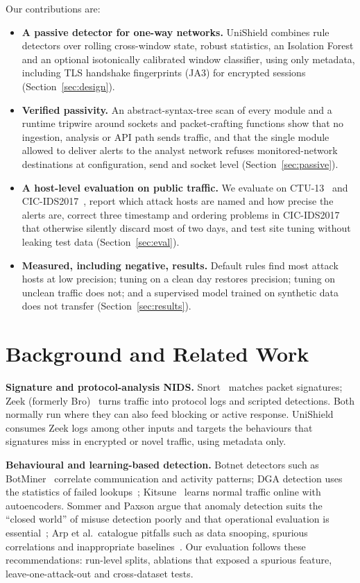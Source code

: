 \documentclass[conference]{IEEEtran}
\begin{document}
Our contributions are:
\begin{itemize}
\item \textbf{A passive detector for one-way networks.} UniShield combines rule detectors over rolling cross-window state, robust statistics, an Isolation Forest and an optional isotonically calibrated window classifier, using only metadata, including TLS handshake fingerprints (JA3) for encrypted sessions (Section~\ref{sec:design}).
\item \textbf{Verified passivity.} An abstract-syntax-tree scan of every module and a runtime tripwire around sockets and packet-crafting functions show that no ingestion, analysis or API path sends traffic, and that the single module allowed to deliver alerts to the analyst network refuses monitored-network destinations at configuration, send and socket level (Section~\ref{sec:passive}).
\item \textbf{A host-level evaluation on public traffic.} We evaluate on CTU-13~\cite{garcia2014empirical} and CIC-IDS2017~\cite{sharafaldin2018toward}, report which attack hosts are named and how precise the alerts are, correct three timestamp and ordering problems in CIC-IDS2017 that otherwise silently discard most of two days, and test site tuning without leaking test data (Section~\ref{sec:eval}).
\item \textbf{Measured, including negative, results.} Default rules find most attack hosts at low precision; tuning on a clean day restores precision; tuning on unclean traffic does not; and a supervised model trained on synthetic data does not transfer (Section~\ref{sec:results}).
\end{itemize}

\section{Background and Related Work}
\textbf{Signature and protocol-analysis NIDS.} Snort~\cite{roesch1999snort} matches packet signatures; Zeek (formerly Bro)~\cite{paxson1999bro} turns traffic into protocol logs and scripted detections. Both normally run where they can also feed blocking or active response. UniShield consumes Zeek logs among other inputs and targets the behaviours that signatures miss in encrypted or novel traffic, using metadata only.

\textbf{Behavioural and learning-based detection.} Botnet detectors such as BotMiner~\cite{gu2008botminer} correlate communication and activity patterns; DGA detection uses the statistics of failed lookups~\cite{antonakakis2012dga}; Kitsune~\cite{mirsky2018kitsune} learns normal traffic online with autoencoders. Sommer and Paxson argue that anomaly detection suits the ``closed world'' of misuse detection poorly and that operational evaluation is essential~\cite{sommer2010outside}; Arp et al.\ catalogue pitfalls such as data snooping, spurious correlations and inappropriate baselines~\cite{arp2022dos}. Our evaluation follows these recommendations: run-level splits, ablations that exposed a spurious feature, leave-one-attack-out and cross-dataset tests.
\end{document}
